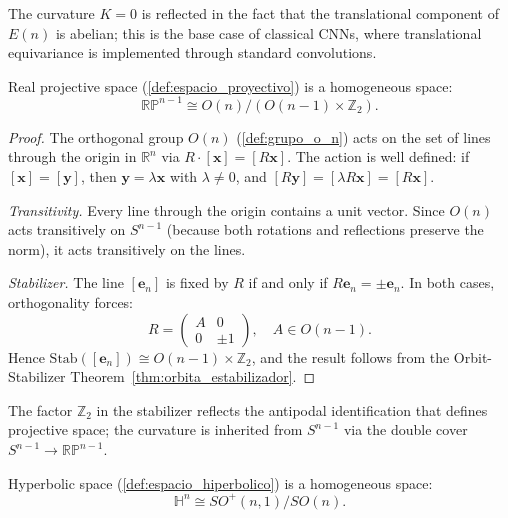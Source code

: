 The curvature $K=0$ is reflected in the fact that the translational component of $E(n)$ is abelian; this is the base case of classical \glspl{CNN}, where translational equivariance is implemented through standard convolutions.

\begin{proposition}\label{prop:proyectivo_cociente}
Real projective space (\autoref{def:espacio_proyectivo}) is a homogeneous space:
\[
\mathbb{RP}^{n-1} \cong O(n)/(O(n-1) \times \mathbb{Z}_2).
\]
\end{proposition}

\begin{proof}
The orthogonal group $O(n)$ (\autoref{def:grupo_o_n}) acts on the set of lines through the origin in $\mathbb{R}^n$ via $R \cdot [\mathbf{x}] = [R\mathbf{x}]$. The action is well defined: if $[\mathbf{x}] = [\mathbf{y}]$, then $\mathbf{y} = \lambda \mathbf{x}$ with $\lambda \neq 0$, and $[R\mathbf{y}] = [\lambda R\mathbf{x}] = [R\mathbf{x}]$.

\textit{Transitivity.} Every line through the origin contains a unit vector. Since $O(n)$ acts transitively on $S^{n-1}$ (because both rotations and reflections preserve the norm), it acts transitively on the lines.

\textit{Stabilizer.} The line $[\mathbf{e}_n]$ is fixed by $R$ if and only if $R\mathbf{e}_n = \pm\mathbf{e}_n$. In both cases, orthogonality forces:
\[
R = \begin{pmatrix} A & 0 \\ 0 & \pm 1 \end{pmatrix}, \quad A \in O(n-1).
\]
Hence $\mathrm{Stab}([\mathbf{e}_n]) \cong O(n-1) \times \mathbb{Z}_2$, and the result follows from the Orbit-Stabilizer Theorem~\ref{thm:orbita_estabilizador}.
\end{proof}

The factor $\mathbb{Z}_2$ in the stabilizer reflects the antipodal identification that defines projective space; the curvature is inherited from $S^{n-1}$ via the double cover $S^{n-1} \to \mathbb{RP}^{n-1}$.

\begin{proposition}\label{prop:hiperbolico_cociente}
Hyperbolic space (\autoref{def:espacio_hiperbolico}) is a homogeneous space:
\[
\mathbb{H}^n \cong SO^+(n,1)/SO(n).
\]
\end{proposition}

